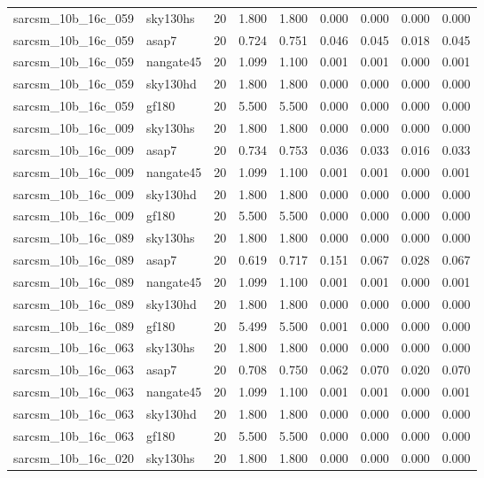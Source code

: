 \begin{tabular}{llrrrrrrr}
sarcsm\_10b\_16c\_059 & sky130hs & 20 & 1.800 & 1.800 & 0.000 & 0.000 & 0.000 & 0.000 \\
sarcsm\_10b\_16c\_059 & asap7 & 20 & 0.724 & 0.751 & 0.046 & 0.045 & 0.018 & 0.045 \\
sarcsm\_10b\_16c\_059 & nangate45 & 20 & 1.099 & 1.100 & 0.001 & 0.001 & 0.000 & 0.001 \\
sarcsm\_10b\_16c\_059 & sky130hd & 20 & 1.800 & 1.800 & 0.000 & 0.000 & 0.000 & 0.000 \\
sarcsm\_10b\_16c\_059 & gf180 & 20 & 5.500 & 5.500 & 0.000 & 0.000 & 0.000 & 0.000 \\
sarcsm\_10b\_16c\_009 & sky130hs & 20 & 1.800 & 1.800 & 0.000 & 0.000 & 0.000 & 0.000 \\
sarcsm\_10b\_16c\_009 & asap7 & 20 & 0.734 & 0.753 & 0.036 & 0.033 & 0.016 & 0.033 \\
sarcsm\_10b\_16c\_009 & nangate45 & 20 & 1.099 & 1.100 & 0.001 & 0.001 & 0.000 & 0.001 \\
sarcsm\_10b\_16c\_009 & sky130hd & 20 & 1.800 & 1.800 & 0.000 & 0.000 & 0.000 & 0.000 \\
sarcsm\_10b\_16c\_009 & gf180 & 20 & 5.500 & 5.500 & 0.000 & 0.000 & 0.000 & 0.000 \\
sarcsm\_10b\_16c\_089 & sky130hs & 20 & 1.800 & 1.800 & 0.000 & 0.000 & 0.000 & 0.000 \\
sarcsm\_10b\_16c\_089 & asap7 & 20 & 0.619 & 0.717 & 0.151 & 0.067 & 0.028 & 0.067 \\
sarcsm\_10b\_16c\_089 & nangate45 & 20 & 1.099 & 1.100 & 0.001 & 0.001 & 0.000 & 0.001 \\
sarcsm\_10b\_16c\_089 & sky130hd & 20 & 1.800 & 1.800 & 0.000 & 0.000 & 0.000 & 0.000 \\
sarcsm\_10b\_16c\_089 & gf180 & 20 & 5.499 & 5.500 & 0.001 & 0.000 & 0.000 & 0.000 \\
sarcsm\_10b\_16c\_063 & sky130hs & 20 & 1.800 & 1.800 & 0.000 & 0.000 & 0.000 & 0.000 \\
sarcsm\_10b\_16c\_063 & asap7 & 20 & 0.708 & 0.750 & 0.062 & 0.070 & 0.020 & 0.070 \\
sarcsm\_10b\_16c\_063 & nangate45 & 20 & 1.099 & 1.100 & 0.001 & 0.001 & 0.000 & 0.001 \\
sarcsm\_10b\_16c\_063 & sky130hd & 20 & 1.800 & 1.800 & 0.000 & 0.000 & 0.000 & 0.000 \\
sarcsm\_10b\_16c\_063 & gf180 & 20 & 5.500 & 5.500 & 0.000 & 0.000 & 0.000 & 0.000 \\
sarcsm\_10b\_16c\_020 & sky130hs & 20 & 1.800 & 1.800 & 0.000 & 0.000 & 0.000 & 0.000 \\

\end{tabular}
